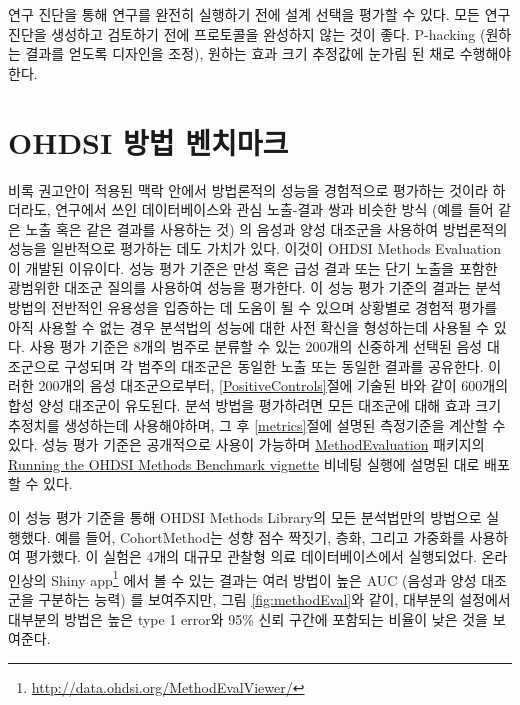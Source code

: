 \documentclass[11pt]{book}
\let\rmarkdownfootnote\footnote%
\def\footnote{\protect\rmarkdownfootnote}
\theoremstyle{definition}
\theoremstyle{definition}
\theoremstyle{definition}
\theoremstyle{remark}
\let\BeginKnitrBlock\begin \let\EndKnitrBlock\end
\begin{document}
\BeginKnitrBlock{rmdimportant}
연구 진단을 통해 연구를 완전히 실행하기 전에 설계 선택을 평가할 수 있다.
모든 연구 진단을 생성하고 검토하기 전에 프로토콜을 완성하지 않는 것이
좋다. P-hacking (원하는 결과를 얻도록 디자인을 조정), 원하는 효과 크기
추정값에 눈가림 된 채로 수행해야 한다.
\EndKnitrBlock{rmdimportant}

\section{OHDSI 방법 벤치마크}\label{ohdsi--}


비록 권고안이 적용된 맥락 안에서 방법론적의 성능을 경험적으로 평가하는
것이라 하더라도, 연구에서 쓰인 데이터베이스와 관심 노출-결과 쌍과 비슷한
방식 (예를 들어 같은 노출 혹은 같은 결과를 사용하는 것) 의 음성과 양성
대조군을 사용하여 방법론적의 성능을 일반적으로 평가하는 데도 가치가
있다. 이것이 OHDSI Methods Evaluation이 개발된 이유이다. 성능 평가
기준은 만성 혹은 급성 결과 또는 단기 노출을 포함한 광범위한 대조군
질의를 사용하여 성능을 평가한다. 이 성능 평가 기준의 결과는 분석 방법의
전반적인 유용성을 입증하는 데 도움이 될 수 있으며 상황별로 경험적 평가를
아직 사용할 수 없는 경우 분석법의 성능에 대한 사전 확신을 형성하는데
사용될 수 있다. 사용 평가 기준은 8개의 범주로 분류할 수 있는 200개의
신중하게 선택된 음성 대조군으로 구성되며 각 범주의 대조군은 동일한 노출
또는 동일한 결과를 공유한다. 이러한 200개의 음성 대조군으로부터,
\ref{PositiveControls}절에 기술된 바와 같이 600개의 합성 양성 대조군이
유도된다. 분석 방법을 평가하려면 모든 대조군에 대해 효과 크기 추정치를
생성하는데 사용해야하며, 그 후 \ref{metrics}절에 설명된 측정기준을
계산할 수 있다. 성능 평가 기준은 공개적으로 사용이 가능하며
\href{https://ohdsi.github.io/MethodEvaluation/}{MethodEvaluation}
패키지의
\href{https://ohdsi.github.io/MethodEvaluation/articles/OhdsiMethodsBenchmark.html}{Running
the OHDSI Methods Benchmark vignette} 비네팅 실행에 설명된 대로 배포할
수 있다.

이 성능 평가 기준을 통해 OHDSI Methods Library의 모든 분석법만의
방법으로 실행했다. 예를 들어, CohortMethod는 성향 점수 짝짓기, 층화,
그리고 가중화를 사용하여 평가했다. 이 실험은 4개의 대규모 관찰형 의료
데이터베이스에서 실행되었다. 온라인상의 Shiny app\footnote{\url{http://data.ohdsi.org/MethodEvalViewer/}}
에서 볼 수 있는 결과는 여러 방법이 높은 AUC (음성과 양성 대조군을
구분하는 능력) 를 보여주지만, 그림 \ref{fig:methodEval}와 같이, 대부분의
설정에서 대부분의 방법은 높은 type 1 error와 95\% 신뢰 구간에 포함되는
비율이 낮은 것을 보여준다.
\end{document}

